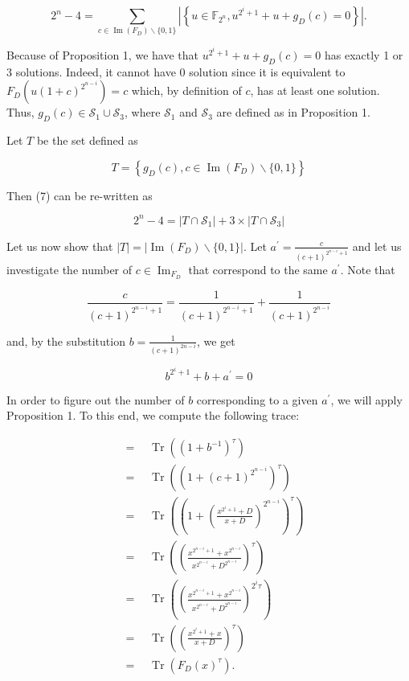 \documentclass[10pt]{article}
\begin{document}
\begin{equation*}
2^{n}-4=\sum_{c \in \operatorname{Im}\left(F_{D}\right) \backslash\{0,1\}}\left|\left\{u \in \mathbb{F}_{2^{n}}, u^{2^{i}+1}+u+g_{D}(c)=0\right\}\right| . \tag{7}
\end{equation*}


Because of Proposition 1, we have that $u^{2^{i}+1}+u+g_{D}(c)=0$ has exactly 1 or 3 solutions. Indeed, it cannot have 0 solution since it is equivalent to $F_{D}\left(u(1+c)^{2^{n-i}}\right)=c$ which, by definition of $c$, has at least one solution. Thus, $g_{D}(c) \in \mathcal{S}_{1} \cup \mathcal{S}_{3}$, where $\mathcal{S}_{1}$ and $\mathcal{S}_{3}$ are defined as in Proposition 1.

Let $T$ be the set defined as

$$
T=\left\{g_{D}(c), c \in \operatorname{Im}\left(F_{D}\right) \backslash\{0,1\}\right\}
$$

Then (7) can be re-written as


\begin{equation*}
2^{n}-4=\left|T \cap \mathcal{S}_{1}\right|+3 \times\left|T \cap \mathcal{S}_{3}\right| \tag{8}
\end{equation*}


Let us now show that $|T|=\left|\operatorname{Im}\left(F_{D}\right) \backslash\{0,1\}\right|$. Let $a^{\prime}=\frac{c}{(c+1)^{2^{n-i}+1}}$ and let us investigate the number of $c \in \operatorname{Im}_{F_{D}}$ that correspond to the same $a^{\prime}$. Note that

$$
\frac{c}{(c+1)^{2^{n-i}+1}}=\frac{1}{(c+1)^{2^{n-i}+1}}+\frac{1}{(c+1)^{2^{n-i}}}
$$

and, by the substitution $b=\frac{1}{(c+1)^{2 n-i}}$, we get

$$
b^{2^{i}+1}+b+a^{\prime}=0
$$

In order to figure out the number of $b$ corresponding to a given $a^{\prime}$, we will apply Proposition 1. To this end, we compute the following trace:

$$
\begin{aligned}
& =\quad \operatorname{Tr}\left(\left(1+b^{-1}\right)^{\tau}\right) \\
& =\quad \operatorname{Tr}\left(\left(1+(c+1)^{2^{n-i}}\right)^{\tau}\right) \\
& =\quad \operatorname{Tr}\left(\left(1+\left(\frac{x^{2^{i}+1}+D}{x+D}\right)^{2^{n-i}}\right)^{\tau}\right) \\
& =\quad \operatorname{Tr}\left(\left(\frac{x^{2^{n-i}+1}+x^{2^{n-i}}}{x^{2^{n-i}}+D^{2^{n-i}}}\right)^{\tau}\right) \\
& =\quad \operatorname{Tr}\left(\left(\frac{x^{2^{n-i}+1}+x^{2^{n-i}}}{x^{2^{n-i}}+D^{2^{n-i}}}\right)^{2^{i} \tau}\right) \\
& =\quad \operatorname{Tr}\left(\left(\frac{x^{2^{i}+1}+x}{x+D}\right)^{\tau}\right) \\
& =\quad \operatorname{Tr}\left(F_{D}(x)^{\tau}\right) .
\end{aligned}
$$
\end{document}
